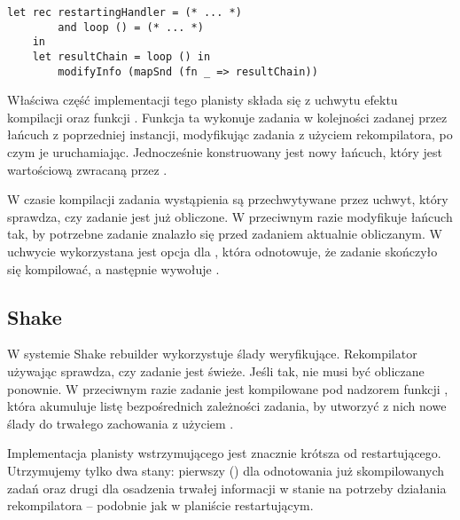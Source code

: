 
\vspace{-1.25em}
\begin{lstlisting}[style=Haleff-long]
    let rec restartingHandler = (* ... *)
        and loop () = (* ... *)
    in
    let resultChain = loop () in
        modifyInfo (mapSnd (fn _ => resultChain))
\end{lstlisting}

Właściwa część implementacji tego planisty składa się z uchwytu efektu kompilacji  oraz funkcji . Funkcja ta wykonuje zadania w kolejności zadanej przez łańcuch z poprzedniej instancji, modyfikując zadania z użyciem rekompilatora, po czym je uruchamiając. Jednocześnie konstruowany jest nowy łańcuch, który jest wartościową zwracaną przez .



W czasie kompilacji zadania wystąpienia  są przechwytywane przez uchwyt, który sprawdza, czy zadanie jest już obliczone. W przeciwnym razie modyfikuje łańcuch tak, by potrzebne zadanie znalazło się przed zadaniem aktualnie obliczanym. W uchwycie wykorzystana jest opcja dla , która odnotowuje, że zadanie skończyło się kompilować, a następnie wywołuje .

\subsection{Shake}



W systemie Shake rebuilder wykorzystuje ślady weryfikujące. Rekompilator używając  sprawdza, czy zadanie jest świeże. Jeśli tak, nie musi być obliczane ponownie. W przeciwnym razie zadanie jest kompilowane pod nadzorem funkcji , która akumuluje listę bezpośrednich zależności zadania, by utworzyć z nich nowe ślady do trwałego zachowania z użyciem .

\pagebreak



Implementacja planisty wstrzymującego jest znacznie krótsza od restartującego. Utrzymujemy tylko dwa stany: pierwszy () dla odnotowania już skompilowanych zadań oraz drugi dla osadzenia trwałej informacji w stanie na potrzeby działania rekompilatora -- podobnie jak w planiście restartującym.

